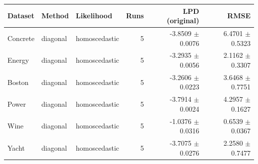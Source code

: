 \begin{tabular}{lllrrr}
\toprule
Dataset & Method & Likelihood & Runs & LPD (original) & RMSE \\
\midrule
Concrete & diagonal & homoscedastic & 5 & -3.8509 $\pm$ 0.0076 & 6.4701 $\pm$ 0.5323 \\
Energy & diagonal & homoscedastic & 5 & -3.2935 $\pm$ 0.0056 & 2.1162 $\pm$ 0.3307 \\
Boston & diagonal & homoscedastic & 5 & -3.2606 $\pm$ 0.0223 & 3.6468 $\pm$ 0.7751 \\
Power & diagonal & homoscedastic & 5 & -3.7914 $\pm$ 0.0024 & 4.2957 $\pm$ 0.1627 \\
Wine & diagonal & homoscedastic & 5 & -1.0376 $\pm$ 0.0316 & 0.6539 $\pm$ 0.0367 \\
Yacht & diagonal & homoscedastic & 5 & -3.7075 $\pm$ 0.0276 & 2.2580 $\pm$ 0.7477 \\
\bottomrule
\end{tabular}

